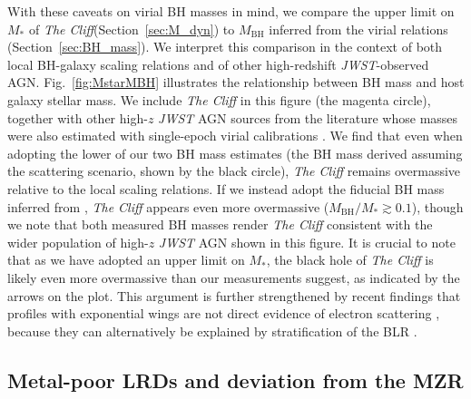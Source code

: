 \documentclass[fleqn,usenatbib]{mnras}
\newcommand{\jwst}{\textit{JWST}\xspace}
\newcommand{\Halpha}{\text{H\textalpha}\xspace}
\newcommand{\Hbeta}{\text{H\textbeta}\xspace}
\newcommand{\cliff}{\textit{The Cliff}\xspace}
\begin{document}
With these caveats on virial BH masses in mind, we compare the upper limit on $M_\ast$ of \cliff (Section~\ref{sec:M_dyn}) to $M_\mathrm{BH}$ inferred from the virial relations (Section~\ref{sec:BH_mass}). 
We interpret this comparison in the context of both local BH-galaxy scaling relations and of other high-redshift \jwst-observed AGN.
Fig.~\ref{fig:MstarMBH} illustrates the relationship between BH mass and host galaxy stellar mass. 
We include \cliff in this figure (the magenta circle), together with other high-$z$ \jwst AGN sources from the literature whose masses were also estimated with single-epoch virial calibrations \citep[or direct dynamical measurement in the case of QSO1;][]{Juodzbalis2025_QSO1}. 
We find that even when adopting the lower of our two BH mass estimates (the BH mass derived assuming the scattering scenario, shown by the black circle), \cliff remains overmassive relative to the local scaling relations. 
If we instead adopt the fiducial BH mass inferred from \Hbeta, \cliff appears even more overmassive ($M_\mathrm{BH}/M_\ast \gtrsim 0.1$), though we note that both measured BH masses render \cliff consistent with the wider population of high-$z$ \jwst AGN shown in this figure.
It is crucial to note that as we have adopted an upper limit on $M_\ast$, the black hole of \cliff is likely even more overmassive than our measurements suggest, as indicated by the arrows on the plot. This argument is further strengthened by recent findings that \Halpha profiles with exponential wings are not direct evidence of electron scattering \citep{Brazzini2025, Brazzini2026}, because they can alternatively be explained by stratification of the BLR \citep{Scholtz2026_LRD, Madau2026b}.



\subsection{Metal-poor LRDs and deviation from the MZR}\label{sec:mass-metal-relation}
\end{document}
